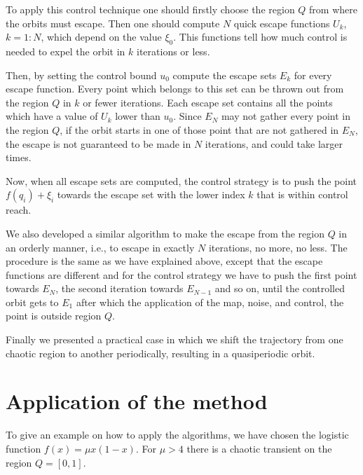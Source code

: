 To apply this control technique one should firstly choose the region $Q$ from where the orbits must escape. Then one should compute $N$ quick escape functions $U_k$, $k = 1:N$, which depend on the value $\xi_0$. This functions tell how much control is needed to expel the orbit in $k$ iterations or less.

Then, by setting the control bound $u_0$ compute the escape sets $E_k$ for every escape function. Every point which belongs to this set can be thrown out from the region $Q$ in $k$ or fewer iterations. Each escape set contains all the points which have a value of $U_k$ lower than $u_0$. Since $E_N$ may not gather every point in the region $Q$, if the orbit starts in one of those point that are not gathered in $E_N$, the escape is not guaranteed to be made in $N$ iterations, and could take larger times.

Now, when all escape sets are computed, the control strategy is to push the point $f(q_i) + \xi_i$ towards the escape set with the lower index $k$ that is within control reach.

We also developed a similar algorithm to make the escape from the region $Q$ in an orderly manner, i.e., to escape in exactly $N$ iterations, no more, no less. The procedure is the same as we have explained above, except that the escape functions are different and for the control strategy we have to push the first point towards $E_N$, the second iteration towards $E_{N-1}$ and so on, until the controlled orbit gets to $E_1$ after which the application of the map, noise, and control, the point is outside region $Q$.

Finally we presented a practical case in which we shift the trajectory from one chaotic region to another periodically, resulting in a quasiperiodic orbit.

\section{Application of the method}


To give an example on how to apply the algorithms, we have chosen the logistic function $f(x) = \mu x(1-x)$. For $\mu > 4$ there is a chaotic transient on the region $Q=[0,1]$. 

